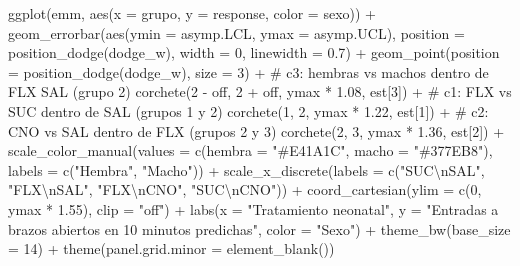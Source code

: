 \documentclass[
  letterpaper,
  DIV=11,
  numbers=noendperiod]{scrartcl}
\newenvironment{Shaded}{\begin{snugshade}}{\end{snugshade}}
\newcommand{\AttributeTok}[1]{\textcolor[rgb]{0.40,0.45,0.13}{#1}}
\newcommand{\CommentTok}[1]{\textcolor[rgb]{0.37,0.37,0.37}{#1}}
\newcommand{\DecValTok}[1]{\textcolor[rgb]{0.68,0.00,0.00}{#1}}
\newcommand{\FloatTok}[1]{\textcolor[rgb]{0.68,0.00,0.00}{#1}}
\newcommand{\FunctionTok}[1]{\textcolor[rgb]{0.28,0.35,0.67}{#1}}
\newcommand{\NormalTok}[1]{\textcolor[rgb]{0.00,0.23,0.31}{#1}}
\newcommand{\SpecialCharTok}[1]{\textcolor[rgb]{0.37,0.37,0.37}{#1}}
\newcommand{\StringTok}[1]{\textcolor[rgb]{0.13,0.47,0.30}{#1}}
\begin{document}
\begin{Shaded}
\begin{Highlighting}[]
\FunctionTok{ggplot}\NormalTok{(emm, }\FunctionTok{aes}\NormalTok{(}\AttributeTok{x =}\NormalTok{ grupo, }\AttributeTok{y =}\NormalTok{ response, }\AttributeTok{color =}\NormalTok{ sexo)) }\SpecialCharTok{+}
  \FunctionTok{geom\_errorbar}\NormalTok{(}\FunctionTok{aes}\NormalTok{(}\AttributeTok{ymin =}\NormalTok{ asymp.LCL, }\AttributeTok{ymax =}\NormalTok{ asymp.UCL),}
                \AttributeTok{position =} \FunctionTok{position\_dodge}\NormalTok{(dodge\_w), }\AttributeTok{width =} \DecValTok{0}\NormalTok{, }\AttributeTok{linewidth =} \FloatTok{0.7}\NormalTok{) }\SpecialCharTok{+}
  \FunctionTok{geom\_point}\NormalTok{(}\AttributeTok{position =} \FunctionTok{position\_dodge}\NormalTok{(dodge\_w), }\AttributeTok{size =} \DecValTok{3}\NormalTok{) }\SpecialCharTok{+}
  \CommentTok{\# c3: hembras vs machos dentro de FLX SAL (grupo 2)}
  \FunctionTok{corchete}\NormalTok{(}\DecValTok{2} \SpecialCharTok{{-}}\NormalTok{ off, }\DecValTok{2} \SpecialCharTok{+}\NormalTok{ off, ymax }\SpecialCharTok{*} \FloatTok{1.08}\NormalTok{, est[}\DecValTok{3}\NormalTok{]) }\SpecialCharTok{+}
  \CommentTok{\# c1: FLX vs SUC dentro de SAL (grupos 1 y 2)}
  \FunctionTok{corchete}\NormalTok{(}\DecValTok{1}\NormalTok{, }\DecValTok{2}\NormalTok{, ymax }\SpecialCharTok{*} \FloatTok{1.22}\NormalTok{, est[}\DecValTok{1}\NormalTok{]) }\SpecialCharTok{+}
  \CommentTok{\# c2: CNO vs SAL dentro de FLX (grupos 2 y 3)}
  \FunctionTok{corchete}\NormalTok{(}\DecValTok{2}\NormalTok{, }\DecValTok{3}\NormalTok{, ymax }\SpecialCharTok{*} \FloatTok{1.36}\NormalTok{, est[}\DecValTok{2}\NormalTok{]) }\SpecialCharTok{+}
  \FunctionTok{scale\_color\_manual}\NormalTok{(}\AttributeTok{values =} \FunctionTok{c}\NormalTok{(}\AttributeTok{hembra =} \StringTok{"\#E41A1C"}\NormalTok{, }\AttributeTok{macho =} \StringTok{"\#377EB8"}\NormalTok{),}
                     \AttributeTok{labels =} \FunctionTok{c}\NormalTok{(}\StringTok{"Hembra"}\NormalTok{, }\StringTok{"Macho"}\NormalTok{)) }\SpecialCharTok{+}
  \FunctionTok{scale\_x\_discrete}\NormalTok{(}\AttributeTok{labels =} \FunctionTok{c}\NormalTok{(}\StringTok{"SUC}\SpecialCharTok{\textbackslash{}n}\StringTok{SAL"}\NormalTok{, }\StringTok{"FLX}\SpecialCharTok{\textbackslash{}n}\StringTok{SAL"}\NormalTok{, }\StringTok{"FLX}\SpecialCharTok{\textbackslash{}n}\StringTok{CNO"}\NormalTok{, }\StringTok{"SUC}\SpecialCharTok{\textbackslash{}n}\StringTok{CNO"}\NormalTok{)) }\SpecialCharTok{+}
  \FunctionTok{coord\_cartesian}\NormalTok{(}\AttributeTok{ylim =} \FunctionTok{c}\NormalTok{(}\DecValTok{0}\NormalTok{, ymax }\SpecialCharTok{*} \FloatTok{1.55}\NormalTok{), }\AttributeTok{clip =} \StringTok{"off"}\NormalTok{) }\SpecialCharTok{+}
  \FunctionTok{labs}\NormalTok{(}\AttributeTok{x =} \StringTok{"Tratamiento neonatal"}\NormalTok{,}
       \AttributeTok{y =} \StringTok{"Entradas a brazos abiertos en 10 minutos predichas"}\NormalTok{,}
       \AttributeTok{color =} \StringTok{"Sexo"}\NormalTok{) }\SpecialCharTok{+}
  \FunctionTok{theme\_bw}\NormalTok{(}\AttributeTok{base\_size =} \DecValTok{14}\NormalTok{) }\SpecialCharTok{+}
  \FunctionTok{theme}\NormalTok{(}\AttributeTok{panel.grid.minor =} \FunctionTok{element\_blank}\NormalTok{())}
\end{Highlighting}
\end{Shaded}
\end{document}
